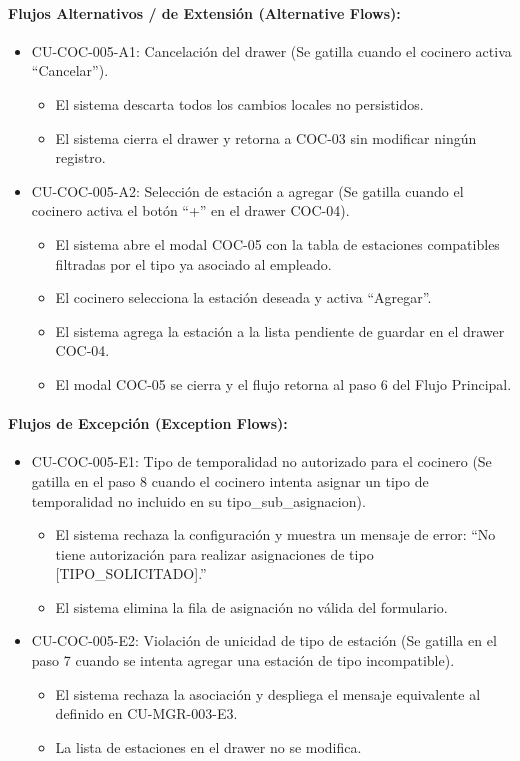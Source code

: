 \paragraph{Flujos Alternativos / de Extensión (Alternative Flows):}
\begin{itemize}
    \item CU-COC-005-A1: Cancelación del drawer (Se gatilla cuando el cocinero activa ``Cancelar'').
    \begin{itemize}
        \item El sistema descarta todos los cambios locales no persistidos.
        \item El sistema cierra el drawer y retorna a COC-03 sin modificar ningún registro.
    \end{itemize}
    \item CU-COC-005-A2: Selección de estación a agregar (Se gatilla cuando el cocinero activa el botón ``+'' en el drawer COC-04).
    \begin{itemize}
        \item El sistema abre el modal COC-05 con la tabla de estaciones compatibles filtradas por el tipo ya asociado al empleado.
        \item El cocinero selecciona la estación deseada y activa ``Agregar''.
        \item El sistema agrega la estación a la lista pendiente de guardar en el drawer COC-04.
        \item El modal COC-05 se cierra y el flujo retorna al paso 6 del Flujo Principal.
    \end{itemize}
\end{itemize}

\paragraph{Flujos de Excepción (Exception Flows):}
\begin{itemize}
    \item CU-COC-005-E1: Tipo de temporalidad no autorizado para el cocinero (Se gatilla en el paso 8 cuando el cocinero intenta asignar un tipo de temporalidad no incluido en su tipo\_sub\_asignacion).
    \begin{itemize}
        \item El sistema rechaza la configuración y muestra un mensaje de error: ``No tiene autorización para realizar asignaciones de tipo [TIPO\_SOLICITADO].''
        \item El sistema elimina la fila de asignación no válida del formulario.
    \end{itemize}
    \item CU-COC-005-E2: Violación de unicidad de tipo de estación (Se gatilla en el paso 7 cuando se intenta agregar una estación de tipo incompatible).
    \begin{itemize}
        \item El sistema rechaza la asociación y despliega el mensaje equivalente al definido en CU-MGR-003-E3.
        \item La lista de estaciones en el drawer no se modifica.
    \end{itemize}
\end{itemize}

